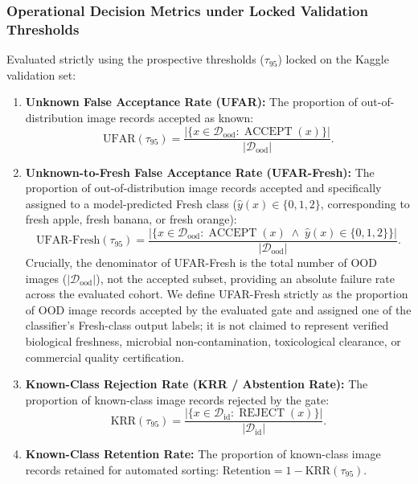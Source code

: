 \subsubsection{Operational Decision Metrics under Locked Validation Thresholds}
Evaluated strictly using the prospective thresholds ($\tau_{95}$) locked on the Kaggle validation set:
\begin{enumerate}
\item \textbf{Unknown False Acceptance Rate (UFAR):} The proportion of out-of-distribution image records accepted as known:
\begin{equation}
\text{UFAR}(\tau_{95}) = \frac{|\{x \in \mathcal{D}_{\text{ood}} : \operatorname{ACCEPT}(x)\}|}{|\mathcal{D}_{\text{ood}}|}.
\end{equation}
\item \textbf{Unknown-to-Fresh False Acceptance Rate (UFAR-Fresh):} The proportion of out-of-distribution image records accepted and specifically assigned to a model-predicted Fresh class ($\hat{y}(x) \in \{0, 1, 2\}$, corresponding to fresh apple, fresh banana, or fresh orange):
\begin{equation}
\text{UFAR-Fresh}(\tau_{95}) = \frac{|\{x \in \mathcal{D}_{\text{ood}} : \operatorname{ACCEPT}(x) \;\land\; \hat{y}(x) \in \{0, 1, 2\}\}|}{|\mathcal{D}_{\text{ood}}|}.
\end{equation}
Crucially, the denominator of UFAR-Fresh is the total number of OOD images ($|\mathcal{D}_{\text{ood}}|$), not the accepted subset, providing an absolute failure rate across the evaluated cohort. We define UFAR-Fresh strictly as the proportion of OOD image records accepted by the evaluated gate and assigned one of the classifier's Fresh-class output labels; it is not claimed to represent verified biological freshness, microbial non-contamination, toxicological clearance, or commercial quality certification.
\item \textbf{Known-Class Rejection Rate (KRR / Abstention Rate):} The proportion of known-class image records rejected by the gate:
\begin{equation}
\text{KRR}(\tau_{95}) = \frac{|\{x \in \mathcal{D}_{\text{id}} : \operatorname{REJECT}(x)\}|}{|\mathcal{D}_{\text{id}}|}.
\end{equation}
\item \textbf{Known-Class Retention Rate:} The proportion of known-class image records retained for automated sorting: $\text{Retention} = 1 - \text{KRR}(\tau_{95})$.
\end{enumerate}

